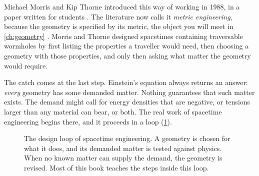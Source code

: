 Michael Morris and Kip Thorne introduced this way of working in 1988, in a paper
written for students \parencite{Morris1988a}. The literature now calls it
\emph{metric engineering}, because the geometry is specified by its metric,
the object you will meet in \cref{ch:geometry}
\parencite{McMonigal2012,Schuster2023}. Morris and Thorne designed spacetimes
containing traversable wormholes by first listing the properties a traveller
would need, then choosing a geometry with those properties, and only then
asking what matter the geometry would require.

The catch comes at the last step. Einstein's equation always returns an answer:
\emph{every} geometry has some demanded matter. Nothing guarantees that such
matter exists. The demand might call for energy densities that are negative, or
tensions larger than any material can bear, or both. The real work of spacetime
engineering begins there, and it proceeds in a loop (\cref{fig:design-loop}).

\begin{figure}[htbp]
\centering
{}
\caption{The design loop of spacetime engineering. A geometry is chosen for what
it does, and its demanded matter is tested against physics. When no known
matter can supply the demand, the geometry is revised. Most of this book
teaches the steps inside this loop.}
\label{fig:design-loop}
\end{figure}


